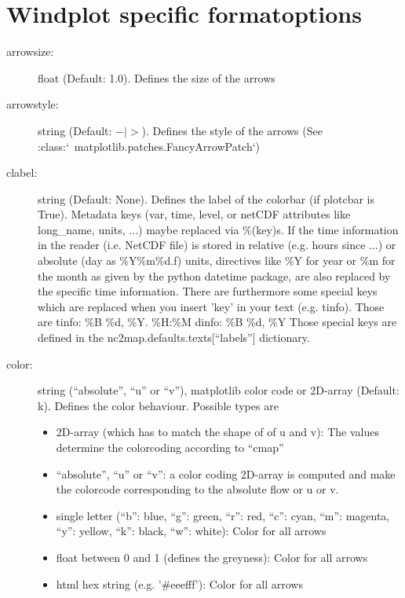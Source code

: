 \section{Windplot specific formatoptions}
\begin{description}
    \item[\gls*{arrowsize}:] \label{item:arrowsize}  float (Default: 1.0). Defines the size of the arrows
    \item[\gls*{arrowstyle}:] \label{item:arrowstyle}  string (Default: $-|>$). Defines the style of the arrows (See :class:`~matplotlib.patches.FancyArrowPatch`)
    \item[\gls*{clabel}:] \label{item:clabel}  string (Default: None). Defines the label of the colorbar (if plotcbar is True). Metadata keys (var, time, level, or netCDF attributes like long\_name, units, ...) maybe replaced via \%(key)s. If the time information in the reader (i.e. NetCDF file) is stored in relative (e.g. hours since ...) or absolute (day as \%Y\%m\%d.f) units, directives like \%Y for year or \%m for the month as given by the python datetime package, are also replaced by the specific time information. There are furthermore some special keys which are replaced when you insert '{key}' in your text (e.g. {tinfo}). Those are tinfo: \%B \%d, \%Y. \%H:\%M dinfo: \%B \%d, \%Y Those special keys are defined in the nc2map.defaults.texts[\enquote{labels}] dictionary.
    \item[\gls*{color}:] \label{item:color}  string (\enquote{absolute}, \enquote{u} or \enquote{v}), matplotlib color code or 2D-array (Default: k). Defines the color behaviour. Possible types are
\begin{itemize}
    \item 2D-array (which has to match the shape of of u and v): The values determine the colorcoding according to \enquote{cmap}
    \item \enquote{absolute}, \enquote{u} or \enquote{v}: a color coding 2D-array is computed and make the colorcode corresponding to the absolute flow or u or v.
    \item single letter (\enquote{b}: blue, \enquote{g}: green, \enquote{r}: red, \enquote{c}: cyan, \enquote{m}: magenta, \enquote{y}: yellow, \enquote{k}: black, \enquote{w}: white): Color for all arrows
    \item float between 0 and 1 (defines the greyness): Color for all arrows
    \item html hex string (e.g. '\#eeefff'): Color for all arrows
\end{itemize}


\end{description}
